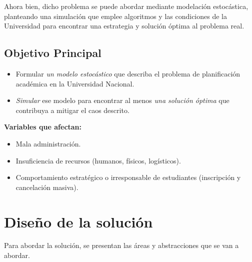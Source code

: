 \documentclass{article}
\begin{document}
Ahora bien, dicho problema se puede abordar mediante modelación estocástica, planteando una simulación 
que emplee algoritmos y las condiciones de la Universidad para encontrar una estrategia y solución 
óptima al problema real.

\subsection{Objetivo Principal}

\begin{itemize}
  \item Formular \textit{un modelo estocástico} que describa el problema de planificación académica 
        en la Universidad Nacional.
  \item \textit{Simular} ese modelo para encontrar al menos \textit{una solución óptima} 
        que contribuya a mitigar el caos descrito.
\end{itemize}

\textbf{Variables que afectan:}

\begin{itemize}
  \item Mala administración.
  \item Insuficiencia de recursos (humanos, físicos, logísticos).
  \item Comportamiento estratégico o irresponsable de estudiantes (inscripción y cancelación masiva).
\end{itemize}


\section{Diseño de la solución}\label{sec:dis}

Para abordar la solución, se presentan las áreas y abstracciones que se van a abordar.
\end{document}
